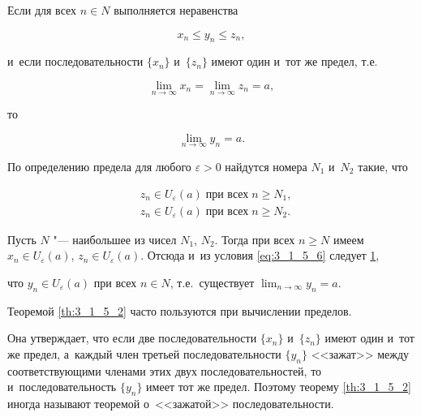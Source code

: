 
\begin{Th}\label{th:3_1_5_2}
Если  для всех $n \in N$ выполняется неравенства

\begin{equation}\label{eq:3_1_5_6}
x_{n} \leqslant y_{n} \leqslant z_{n},
\end{equation}

\noindent
и~если последовательности $\{x_{n}\}$ и~$\{z_{n}\}$ имеют один и~тот же предел,
т.е.\ 

\begin{equation*}
\displaystyle \lim_{n \to \infty} x_{n} = \lim_{n \to \infty} z_{n} = a, 
\end{equation*}

\noindent
то

\begin{equation*}
\displaystyle \lim_{n \to \infty} y_{n} = a.
\end{equation*}
\end{Th}

По определению предела для любого $\varepsilon > 0$ найдутся номера
$N_{1}$ и~$N_{2}$ такие, что

\begin{align*}
& z_{n} \in U_{\varepsilon}(a) \; \text{при всех} \; n \geqslant N_{1}, \\
& z_{n} \in U_{\varepsilon}(a) \; \text{при всех} \; n \geqslant N_{2}.
\end{align*}

\noindent
Пусть $N$ "--- наибольшее из чисел $N_{1}$, $N_{2}$.
Тогда при всех $n \geqslant N$ имеем
$x_{n} \in U_{\varepsilon}(a)$, $z_{n} \in U_{\varepsilon}(a)$.
Отсюда и~из условия \eqref{eq:3_1_5_6} следует \ref{fig:3_1_5_4},

\begin{figure}\label{fig:3_1_5_4}
\end{figure}

\noindent
что $y_{n} \in U_{\varepsilon}(a)$ при всех $n \in N$, т.е.\ существует
$\displaystyle \lim_{n \to \infty} y_{n} = a$.

\begin{Note}\label{nt:3_1_5_3}
Теоремой \ref{th:3_1_5_2} часто пользуются при вычислении пределов.

Она утверждает, что если две последовательности $\{x_{n}\}$ и~$\{z_{n}\}$
имеют один и~тот же предел, а~каждый член третьей последовательности $\{y_{n}\}$
<<зажат>> между соответствующими членами этих двух последовательностей,
то и~последовательность $\{y_{n}\}$ имеет тот же предел.
Поэтому теорему \ref{th:3_1_5_2} иногда называют теоремой о~<<зажатой>>
последовательности.
\end{Note}

